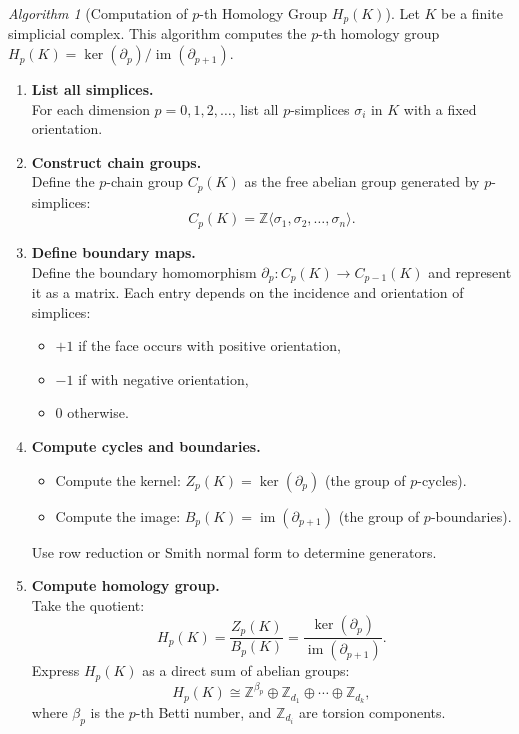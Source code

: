 \documentclass[12pt,oneside,reqno]{amsart}
\theoremstyle{plain}
\theoremstyle{definition}
\theoremstyle{remark}
\newtheorem{algorithm}{Algorithm}
\newcommand{\0}{{\textbf{0}}}
\begin{document}
\begin{algorithm}[Computation of $p$-th Homology Group $H_p(K)$]
Let $K$ be a finite simplicial complex. This algorithm computes the $p$-th homology group $H_p(K) = \ker(\partial_p)/\operatorname{im}(\partial_{p+1})$.

\begin{enumerate}[label=\textbf{Step \arabic*.}, itemsep=1em]
    \item \textbf{List all simplices.}\\
    For each dimension $p = 0, 1, 2, \dots$, list all $p$-simplices $\sigma_i$ in $K$ with a fixed orientation.

    \item \textbf{Construct chain groups.} \\
    Define the $p$-chain group $C_p(K)$ as the free abelian group generated by $p$-simplices:
    \[
    C_p(K) = \mathbb{Z}\langle \sigma_1, \sigma_2, \dots, \sigma_n \rangle.
    \]
    
    \item \textbf{Define boundary maps.} \\
    Define the boundary homomorphism $\partial_p: C_p(K) \to C_{p-1}(K)$ and represent it as a matrix. Each entry depends on the incidence and orientation of simplices:
    \begin{itemize}
        \item $+1$ if the face occurs with positive orientation,
        \item $-1$ if with negative orientation,
        \item $0$ otherwise.
    \end{itemize}

    \item \textbf{Compute cycles and boundaries.}
    \begin{itemize}
        \item Compute the kernel: $Z_p(K) = \ker(\partial_p)$ (the group of $p$-cycles).
        \item Compute the image: $B_p(K) = \operatorname{im}(\partial_{p+1})$ (the group of $p$-boundaries).
    \end{itemize}
    Use row reduction or Smith normal form to determine generators.

    \item \textbf{Compute homology group.} \\
    Take the quotient:
    \[
    H_p(K) = \frac{Z_p(K)}{B_p(K)} = \frac{\ker(\partial_p)}{\operatorname{im}(\partial_{p+1})}.
    \]
    Express $H_p(K)$ as a direct sum of abelian groups:
    \[
    H_p(K) \cong \mathbb{Z}^{\beta_p} \oplus \mathbb{Z}_{d_1} \oplus \cdots \oplus \mathbb{Z}_{d_k},
    \]
    where $\beta_p$ is the $p$-th Betti number, and $\mathbb{Z}_{d_i}$ are torsion components.
\end{enumerate}
\end{algorithm}
\end{document}
